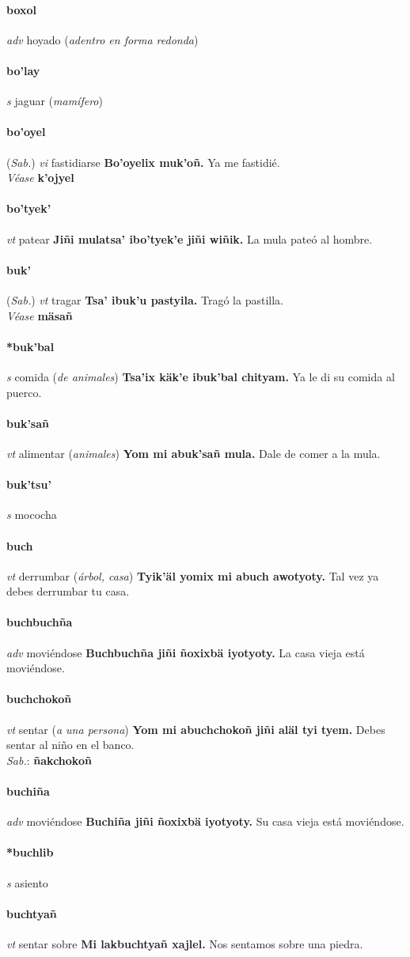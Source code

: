\documentclass{scrbook}
\newcommand{\entry}[1]{\paragraph{#1}}
\newcommand{\partofspeech}[1]{\textit{#1}}
\newcommand{\spanishtranslation}[1]{#1}
\newcommand{\clarification}[1]{(\textit{#1})}
\newcommand{\cholexample}[1]{\textbf{#1}}
\newcommand{\exampletranslation}[1]{#1}
\newcommand{\dialectvariant}[1]{\\\textit{#1}:}
\newcommand{\dialectword}[1]{\textbf{#1}}
\newcommand{\alsosee}[1]{\\\textit{Véase} \textbf{#1}}
\newcommand{\relevantdialect}[1]{(\textit{#1})}
\begin{document}
\begin{multicols}{2}
\entry{boxol}
\partofspeech{adv}
\spanishtranslation{hoyado}
\clarification{adentro en forma redonda}

\entry{bo'lay}
\partofspeech{s}
\spanishtranslation{jaguar}
\clarification{mamífero}

\entry{bo'oyel}
\relevantdialect{Sab.}
\partofspeech{vi}
\spanishtranslation{fastidiarse}
\cholexample{Bo'oyelix muk'oñ.}
\exampletranslation{Ya me fastidié.}
\alsosee{k'ojyel}

\entry{bo'tyek'}
\partofspeech{vt}
\spanishtranslation{patear}
\cholexample{Jiñi mulatsa' ibo'tyek'e jiñi wiñik.}
\exampletranslation{La mula pateó al hombre.}

\entry{buk'}
\relevantdialect{Sab.}
\partofspeech{vt}
\spanishtranslation{tragar}
\cholexample{Tsa' ibuk'u pastyila.}
\exampletranslation{Tragó la pastilla.}
\alsosee{mäsañ}

\entry{*buk'bal}
\partofspeech{s}
\spanishtranslation{comida}
\clarification{de animales}
\cholexample{Tsa'ix käk'e ibuk'bal chityam.}
\exampletranslation{Ya le di su comida al puerco.}

\entry{buk'sañ}
\partofspeech{vt}
\spanishtranslation{alimentar}
\clarification{animales}
\cholexample{Yom mi abuk'sañ mula.}
\exampletranslation{Dale de comer a la mula.}

\entry{buk'tsu'}
\partofspeech{s}
\spanishtranslation{mococha}

\entry{buch}
\partofspeech{vt}
\spanishtranslation{derrumbar}
\clarification{árbol, casa}
\cholexample{Tyik'äl yomix mi abuch awotyoty.}
\exampletranslation{Tal vez ya debes derrumbar tu casa.}

\entry{buchbuchña}
\partofspeech{adv}
\spanishtranslation{moviéndose}
\cholexample{Buchbuchña jiñi ñoxixbä iyotyoty.}
\exampletranslation{La casa vieja está moviéndose.}

\entry{buchchokoñ}
\partofspeech{vt}
\spanishtranslation{sentar}
\clarification{a una persona}
\cholexample{Yom mi abuchchokoñ jiñi aläl tyi tyem.}
\exampletranslation{Debes sentar al niño en el banco.}
\dialectvariant{Sab.}
\dialectword{ñakchokoñ}

\entry{buchiña}
\partofspeech{adv}
\spanishtranslation{moviéndose}
\cholexample{Buchiña jiñi ñoxixbä iyotyoty.}
\exampletranslation{Su casa vieja está moviéndose.}

\entry{*buchlib}
\partofspeech{s}
\spanishtranslation{asiento}

\entry{buchtyañ}
\partofspeech{vt}
\spanishtranslation{sentar sobre}
\cholexample{Mi lakbuchtyañ xajlel.}
\exampletranslation{Nos sentamos sobre una piedra.}


\end{multicols}
\end{document}
